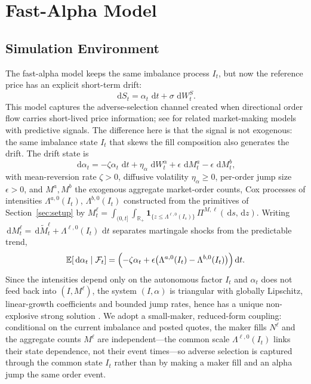 \documentclass[11pt,a4paper]{article}
\newcommand{\E}{\mathbb{E}}
\newcommand{\R}{\mathbb{R}}
\newcommand{\Fcal}{\mathcal{F}}
\newcommand{\dd}{\,\mathrm{d}}
\theoremstyle{plain}
\theoremstyle{definition}
\begin{document}
\section{Fast-Alpha Model}
\label{sec:fast_alpha}

\subsection{Simulation Environment}

The fast-alpha model keeps the same imbalance process \(I_t\), but now the
reference price has an explicit short-term drift:
\begin{equation}
\dd S_t=\alpha_t\,\dd t+\sigma\,\dd W^S_t.
\label{eq:alpha_price}
\end{equation}
This model captures the adverse-selection channel created when directional
order flow carries short-lived price information; see
\cite{CarteaJaimungalRicci2014,CarteaJaimungal2015,CarteaJaimungalPenalva2015,CarteaDonnellyJaimungal2018}
for related market-making models with predictive signals.  The difference here
is that the signal is not exogenous: the same imbalance state \(I_t\) that
skews the fill composition also generates the drift.  The drift state is
\begin{equation}
\dd\alpha_t
=
-\zeta\alpha_t\,\dd t
+\eta_\alpha\,\dd W^\alpha_t
+\epsilon\,\dd M_t^a
-\epsilon\,\dd M_t^b,
\label{eq:alpha_full_sde}
\end{equation}
with mean-reversion rate \(\zeta>0\), diffusive volatility \(\eta_\alpha\ge0\),
per-order jump size \(\epsilon>0\), and \(M^a,M^b\) the exogenous aggregate
market-order counts, Cox processes of intensities \(\Lambda^{a,0}(I_t)\),
\(\Lambda^{b,0}(I_t)\) constructed from the primitives of
Section~\ref{sec:setup} by
\(M_t^\ell=\int_{(0,t]}\!\int_{\R_+}\mathbf 1_{\{z\le\Lambda^{\ell,0}(I_s)\}}\,
\Pi^{M,\ell}(\dd s,\dd z)\).  Writing
\(\dd M_t^\ell=\dd\widetilde M_t^\ell+\Lambda^{\ell,0}(I_t)\,\dd t\) separates
martingale shocks from the predictable trend,
\begin{equation}
\E[\dd\alpha_t \mid \Fcal_t] = \Bigl( -\zeta\alpha_t+\epsilon\bigl(\Lambda^{a,0}(I_t)-\Lambda^{b,0}(I_t)\bigr) \Bigr)\dd t.
\label{eq:alpha_expected_drift}
\end{equation}
Since the intensities depend only on the autonomous factor \(I_t\) and
\(\alpha_t\) does not feed back into \((I,M^\ell)\), the system
\((I,\alpha)\) is triangular with globally Lipschitz, linear-growth
coefficients and bounded jump rates, hence has a unique non-explosive strong
solution \cite{Protter2005,Applebaum2009}.  We adopt a small-maker,
reduced-form coupling: conditional on the current imbalance and posted quotes,
the maker fills \(N^\ell\) and the aggregate counts \(M^\ell\) are
independent---the common scale \(\Lambda^{\ell,0}(I_t)\) links their state
dependence, not their event times---so adverse selection is captured through
the common state \(I_t\) rather than by making a maker fill and an alpha jump
the same order event.
\end{document}
